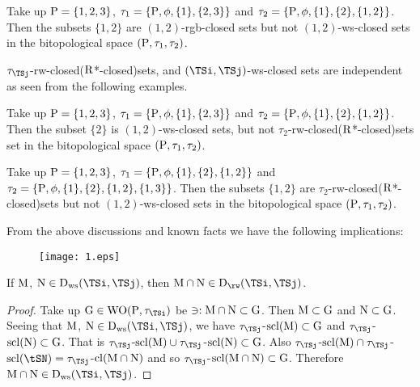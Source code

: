 \begin{exm}\label{exm7.2.20}
Take up $\mathrm{P}=\{1,2,3\}$, $\tau_1 =\{\mathrm{P}, \phi, \{1\}, \{ 2,3\}\}$ and $\tau_2 =\{\mathrm{P}, \phi, \{1\},\{2\},\{1,2\}\}$. Then the subsets $\{1, 2\}$ are $(1, 2)$-rgb-closed sets but not $(1, 2)$-ws-closed sets in the bitopological space $(\mathrm{P}, \tau_1 , \tau_2 )$.
\end{exm}

\begin{rem}\label{rem7.2.21}
$\tau_{\TSj}$-rw-closed($\mathrm{R}$*-closed)sets, and $(\TSi,\TSj)$-ws-closed sets are independent as seen from the following examples.
\end{rem}

\begin{exm}\label{exm7.2.22}
Take up $\mathrm{P}= \{1,2,3\}$, $\tau_1 =\{\mathrm{P}, \phi, \{1\}, \{2,3\}\}$ and $\tau_2 =\{\mathrm{P}, \phi, \{1\},\{2\},\{1, 2\}\}$. Then the subset $\{2\}$ is $(1, 2)$-ws-closed sets, but not $\tau_2$-rw-closed($\mathrm{R}$*-closed)sets set in the bitopological space $(\mathrm{P}, \tau_1 , \tau_2 )$.
\end{exm}

\begin{exm}\label{exm7.2.23}
Take up $\mathrm{P}=\{1,2,3\}$, $\tau_1 =\{\mathrm{P}, \phi, \{1\}, \{2\}, \{1, 2\}\}$ and $\tau_2 =\{\mathrm{P}, \phi, \{1\},\{2\},\{1,2\},\{1, 3\}\}$. Then the subsets $\{1,2\}$ are $\tau_2$-rw-closed($\mathrm{R}$*-closed)sets but not $(1, 2)$-ws-closed sets in the bitopological space $(\mathrm{P}, \tau_1 , \tau_2 )$.
\end{exm}

\begin{rem}\label{rem7.2.24}
From the above discussions and known facts we have the following implications:
\begin{figure}[H]
\cenering
\texttt{[image: 1.eps]}
\end{figure}
\end{rem}

\begin{thm}\label{thm7.2.24}
If $\mathrm{M}$, $\TSN\in \clrD_{\ws} (\TSi, \TSj)$, then $\TSM\cap \TSN\in \clrD_{\rw} (\TSi, \TSj)$.
\end{thm}

\begin{proof}
Take up $\TSG\in \TSW\TSO(\TSP, \tau_{\TSi})$ be $\ni: \mathrm{M}\cap \mathrm{N} \subset \mathrm{G}$. Then $\mathrm{M} \subset \mathrm{G}$ and $\mathrm{N} \subset \mathrm{G}$. Seeing that $\mathrm{M}$, $\TSN\in \clrD_{\ws} (\TSi, \TSj)$, we have $\tau_{\TSj}$-$\mathrm{scl}(\mathrm{M}) \subset \mathrm{G}$ and $\tau_{\TSj}$-$\mathrm{scl}(\mathrm{N}) \subset \mathrm{G}$. That is $\tau_{\TSj}$-$\scl(\TSM) \cup \tau_{\TSj}$-$\mathrm{scl}(\mathrm{N}) \subset \mathrm{G}$. Also $\tau_{\TSj}$-$\scl(\TSM) \cap  \tau_{\TSj}$-$\scl(\tSN)= \tau_{\TSj}$-$\mathrm{cl}(\mathrm{M}\cap \mathrm{N})$ and so $\tau_{\TSj}$-$\mathrm{scl}(\mathrm{M}\cap \mathrm{N}) \subset \mathrm{G}$. Therefore $\TSM\cap \TSN\in \clrD_{\ws} (\TSi, \TSj)$.
\end{proof}

